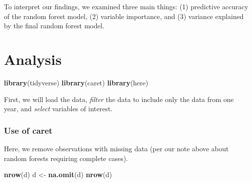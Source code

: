 \documentclass[]{book}
\newenvironment{Shaded}{\begin{snugshade}}{\end{snugshade}}
\newcommand{\KeywordTok}[1]{\textcolor[rgb]{0.13,0.29,0.53}{\textbf{#1}}}
\newcommand{\StringTok}[1]{\textcolor[rgb]{0.31,0.60,0.02}{#1}}
\newcommand{\OperatorTok}[1]{\textcolor[rgb]{0.81,0.36,0.00}{\textbf{#1}}}
\newcommand{\NormalTok}[1]{#1}
\begin{document}
To interpret our findings, we examined three main things: (1) predictive
accuracy of the random forest model, (2) variable importance, and (3)
variance explained by the final random forest model.

\section{Analysis}\label{analysis}

\begin{Shaded}
\begin{Highlighting}[]
\KeywordTok{library}\NormalTok{(tidyverse)}
\KeywordTok{library}\NormalTok{(caret)}
\KeywordTok{library}\NormalTok{(here)}
\end{Highlighting}
\end{Shaded}

First, we will load the data, \emph{filter} the data to include only the
data from one year, and \emph{select} variables of interest.

\begin{Shaded}
\end{Shaded}

\subsubsection{Use of caret}\label{use-of-caret}

Here, we remove observations with missing data (per our note above about
random forests requiring complete cases).

\begin{Shaded}
\begin{Highlighting}[]
\KeywordTok{nrow}\NormalTok{(d)}
\NormalTok{d <-}\StringTok{ }\KeywordTok{na.omit}\NormalTok{(d)}
\KeywordTok{nrow}\NormalTok{(d)}
\end{Highlighting}
\end{Shaded}
\end{document}
